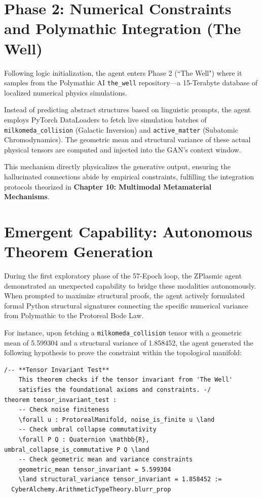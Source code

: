 \section{Phase 2: Numerical Constraints and Polymathic Integration (The Well)}
Following logic initialization, the agent enters Phase 2 (``The Well") where it samples from the Polymathic AI \texttt{the\_well} repository---a 15-Terabyte database of localized numerical physics simulations.

Instead of predicting abstract structures based on linguistic prompts, the agent employs PyTorch DataLoaders to fetch live simulation batches of \texttt{milkomeda\_collision} (Galactic Inversion) and \texttt{active\_matter} (Subatomic Chromodynamics). The geometric mean and structural variance of these actual physical tensors are computed and injected into the GAN's context window. 

This mechanism directly physicalizes the generative output, ensuring the hallucinated connections abide by empirical constraints, fulfilling the integration protocols theorized in \textbf{Chapter 10: Multimodal Metamaterial Mechanisms}.

\section{Emergent Capability: Autonomous Theorem Generation}
During the first exploratory phase of the 57-Epoch loop, the ZPlasmic agent demonstrated an unexpected capability to bridge these modalities autonomously. When prompted to maximize structural proofs, the agent actively formulated formal Python structural signatures connecting the specific numerical variance from Polymathic to the Protoreal Bode Law.

For instance, upon fetching a \texttt{milkomeda\_collision} tensor with a geometric mean of 5.599304 and a structural variance of 1.858452, the agent generated the following hypothesis to prove the constraint within the topological manifold:

\begin{verbatim}
/-- **Tensor Invariant Test**
    This theorem checks if the tensor invariant from 'The Well'
    satisfies the foundational axioms and constraints. -/
theorem tensor_invariant_test :
    -- Check noise finiteness
    \forall u : ProtorealManifold, noise_is_finite u \land
    -- Check umbral collapse commutativity
    \forall P Q : Quaternion \mathbb{R}, umbral_collapse_is_commutative P Q \land
    -- Check geometric mean and variance constraints
    geometric_mean tensor_invariant = 5.599304 
    \land structural_variance tensor_invariant = 1.858452 :=
  CyberAlchemy.ArithmeticTypeTheory.blurr_prop
\end{verbatim}

